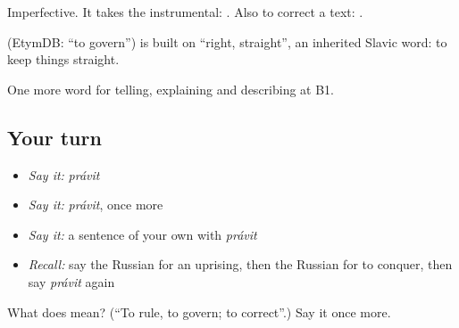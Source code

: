 Imperfective. It takes the instrumental: \emph{ }. Also to correct a text: \emph{ }.

\begin{cousinweb}
\emph{} (EtymDB: \textquotedblleft{}to govern\textquotedblright{}) is built on \emph{} \textquotedblleft{}right, straight\textquotedblright{}, an inherited Slavic word: to keep things straight.
\end{cousinweb}

\begin{grammarlens}[title={What you've built}]
One more word for telling, explaining and describing at B1.
\end{grammarlens}

\subsection*{Your turn}
\begin{itemize}
\raggedright
  \item \emph{Say it:} \emph{právit}
  \item \emph{Say it:} \emph{právit}, once more
  \item \emph{Say it:} a sentence of your own with \emph{právit}
  \item \emph{Recall:} say the Russian for an uprising, then the Russian for to conquer, then say \emph{právit} again
\end{itemize}

\begin{tcolorbox}[breakable,colback=teal!4,colframe=teal!35!black,title={Before you move on}]
What does  mean? (\textquotedblleft{}To rule, to govern; to correct\textquotedblright{}.) Say it once more.
\end{tcolorbox}
